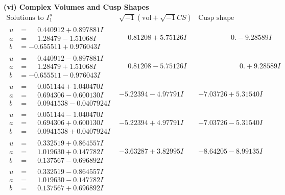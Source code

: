 \documentclass[1p]{elsarticle_modified}
\theoremstyle{definition}
\newcommand{\I}{\sqrt{-1}}
\begin{document}
\newpage\flushleft \textbf{(vi) Complex Volumes and Cusp Shapes}
$$\begin{array}{c|c|c}  
\text{Solutions to }I^u_{1}& \I (\text{vol} + \sqrt{-1}CS) & \text{Cusp shape}\\
 \hline 
\begin{aligned}
u &= \phantom{-}0.440912 + 0.897881 I \\
a &= \phantom{-}1.28479 - 1.51068 I \\
b &= -0.655511 + 0.976043 I\end{aligned}
 & \phantom{-}0.81208 + 5.75126 I & \phantom{-0.000000 } 0. - 9.28589 I \\ \hline\begin{aligned}
u &= \phantom{-}0.440912 - 0.897881 I \\
a &= \phantom{-}1.28479 + 1.51068 I \\
b &= -0.655511 - 0.976043 I\end{aligned}
 & \phantom{-}0.81208 - 5.75126 I & \phantom{-0.000000 -}0. + 9.28589 I \\ \hline\begin{aligned}
u &= \phantom{-}0.051144 + 1.040470 I \\
a &= \phantom{-}0.694306 - 0.600130 I \\
b &= \phantom{-}0.0941538 - 0.0407924 I\end{aligned}
 & -5.22394 - 4.97791 I & -7.03726 + 5.31540 I \\ \hline\begin{aligned}
u &= \phantom{-}0.051144 - 1.040470 I \\
a &= \phantom{-}0.694306 + 0.600130 I \\
b &= \phantom{-}0.0941538 + 0.0407924 I\end{aligned}
 & -5.22394 + 4.97791 I & -7.03726 - 5.31540 I \\ \hline\begin{aligned}
u &= \phantom{-}0.332519 + 0.864557 I \\
a &= \phantom{-}1.019630 + 0.147782 I \\
b &= \phantom{-}0.137567 - 0.696892 I\end{aligned}
 & -3.63287 + 3.82995 I & -8.64205 - 8.99135 I \\ \hline\begin{aligned}
u &= \phantom{-}0.332519 - 0.864557 I \\
a &= \phantom{-}1.019630 - 0.147782 I \\
b &= \phantom{-}0.137567 + 0.696892 I\end{aligned}

\end{array}$$
\end{document}

